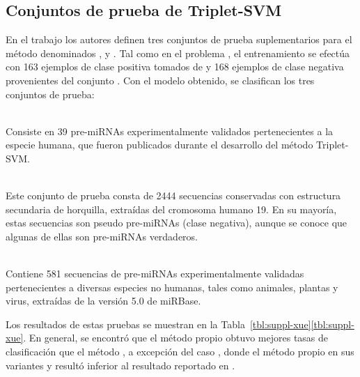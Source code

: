 %
%
\subsection{Conjuntos de prueba de Triplet-SVM}
%
En el trabajo \cite{xue} los autores definen tres conjuntos de prueba
suplementarios para el método \work\tripletsvm{} denominados
,  y .
Tal como en el problema \prob\tripletsvm{}, el entrenamiento se
efectúa con 163 ejemplos de clase positiva tomados de 
y 168 ejemplos de clase negativa provenientes del conjunto
.
Con el modelo obtenido, se clasifican los tres conjuntos de prueba:
%
\begin{description}
  \item{}\\
  Consiste en 39 pre-miRNAs experimentalmente validados pertenecientes a
  la especie humana, que fueron publicados durante el desarrollo del
  método Triplet-SVM.
%
  \item{}\\
  Este conjunto de prueba consta de 2444 secuencias conservadas con
  estructura secundaria de horquilla, extraídas del cromosoma humano
  19. En su mayoría, estas secuencias son pseudo pre-miRNAs (clase
  negativa), aunque se conoce que algunas de ellas son
  pre-miRNAs verdaderos.
%
  \item{}\\
  Contiene 581 secuencias de pre-miRNAs experimentalmente validadas
  pertenecientes a diversas especies no humanas, tales como animales,
  plantas y virus, extraídas de la versión 5.0 de miRBase.
\end{description}
%
Los resultados de estas pruebas se muestran en la
\iflatexml{}Tabla~\ref{tbl:suppl-xue}\else\autoref{tbl:suppl-xue}\fi.
En general, se encontró que el método propio obtuvo mejores tasas de
clasificación que el método \work\tripletsvm{}, a excepción del caso
, donde el método propio en sus variantes
 y  resultó inferior al resultado reportado en
\cite{xue}.
